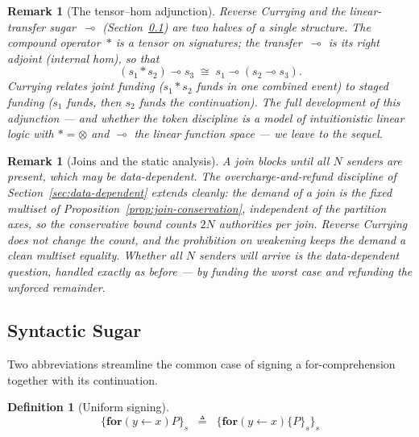 \documentclass[11pt,a4paper]{article}
\newtheorem{definition}[theorem]{Definition}
\newtheorem{remark}[theorem]{Remark}
\newcommand{\forc}{\mathbf{for}}
\newcommand{\recv}[3]{\forc\!\left( #1 \leftarrow #2 \right) #3}
\newcommand{\signed}[2]{\{#1\}_{#2}}
\newcommand{\comp}{\mathbin{*}}
\begin{document}
\begin{remark}[The tensor--hom adjunction]
  \label{rem:tensor-hom}
  Reverse Currying and the linear-transfer sugar~$\multimap$
  (Section~\ref{sec:sugar}) are two halves of a single
  structure.  The compound operator~$\comp$ is a tensor on
  signatures; the transfer~$\multimap$ is its right adjoint
  (internal hom), so that
  \[
    (s_1 \comp s_2) \multimap s_3
    \;\cong\;
    s_1 \multimap (s_2 \multimap s_3).
  \]
  Currying relates joint funding ($s_1 \comp s_2$ funds in one
  combined event) to staged funding ($s_1$ funds, then $s_2$
  funds the continuation).  The full development of this
  adjunction --- and whether the token discipline is a model of
  intuitionistic linear logic with $\comp = \otimes$ and
  $\multimap$ the linear function space --- we leave to the
  sequel.
\end{remark}

\begin{remark}[Joins and the static analysis]
  \label{rem:join-static}
  A join blocks until all $N$ senders are present, which may be
  data-dependent.  The overcharge-and-refund discipline of
  Section~\ref{sec:data-dependent} extends cleanly: the demand
  of a join is the fixed multiset of
  Proposition~\ref{prop:join-conservation}, independent of the
  partition axes, so the conservative bound counts $2N$
  authorities per join.  Reverse Currying does not change the
  count, and the prohibition on weakening keeps the demand a
  clean multiset equality.  Whether all $N$ senders \emph{will}
  arrive is the data-dependent question, handled exactly as
  before --- by funding the worst case and refunding the
  unforced remainder.
\end{remark}

\subsection{Syntactic Sugar}
\label{sec:sugar}

Two abbreviations streamline the common case of signing a
for-comprehension together with its continuation.

\begin{definition}[Uniform signing]
  \label{def:sugar-uniform}
  \begin{equation}
    \signed{\recv{y}{x}{P}}{s}
    \;\;\triangleq\;\;
    \signed{
      \recv{y}{x}{\signed{P}{s}}
    }{s}
    \label{eq:sugar-uniform}
  \end{equation}
\end{definition}
\end{document}
